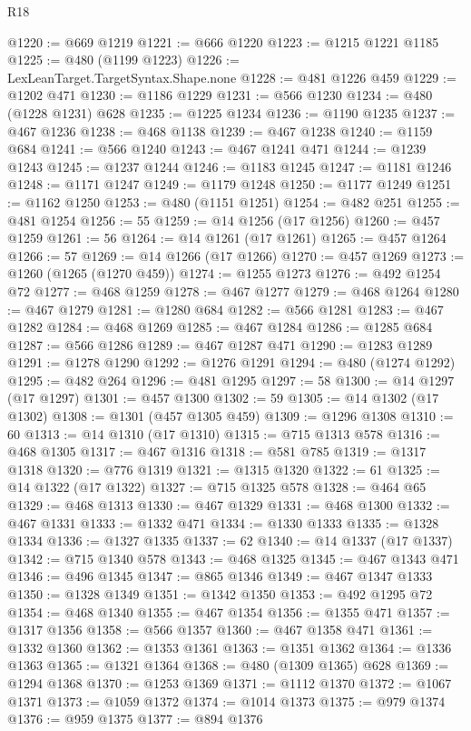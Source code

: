\begin{lexlean}{R18}
\begin{coremodule}
@1220 := @669 @1219
@1221 := @666 @1220
@1223 := @1215 @1221 @1185
@1225 := @480 (@1199 @1223)
@1226 := LexLeanTarget.TargetSyntax.Shape.none
@1228 := @481 @1226 @459
@1229 := @1202 @471
@1230 := @1186 @1229
@1231 := @566 @1230
@1234 := @480 (@1228 @1231) @628
@1235 := @1225 @1234
@1236 := @1190 @1235
@1237 := @467 @1236
@1238 := @468 @1138
@1239 := @467 @1238
@1240 := @1159 @684
@1241 := @566 @1240
@1243 := @467 @1241 @471
@1244 := @1239 @1243
@1245 := @1237 @1244
@1246 := @1183 @1245
@1247 := @1181 @1246
@1248 := @1171 @1247
@1249 := @1179 @1248
@1250 := @1177 @1249
@1251 := @1162 @1250
@1253 := @480 (@1151 @1251)
@1254 := @482 @251
@1255 := @481 @1254
@1256 := 55
@1259 := @14 @1256 (@17 @1256)
@1260 := @457 @1259
@1261 := 56
@1264 := @14 @1261 (@17 @1261)
@1265 := @457 @1264
@1266 := 57
@1269 := @14 @1266 (@17 @1266)
@1270 := @457 @1269
@1273 := @1260 (@1265 (@1270 @459))
@1274 := @1255 @1273
@1276 := @492 @1254 @72
@1277 := @468 @1259
@1278 := @467 @1277
@1279 := @468 @1264
@1280 := @467 @1279
@1281 := @1280 @684
@1282 := @566 @1281
@1283 := @467 @1282
@1284 := @468 @1269
@1285 := @467 @1284
@1286 := @1285 @684
@1287 := @566 @1286
@1289 := @467 @1287 @471
@1290 := @1283 @1289
@1291 := @1278 @1290
@1292 := @1276 @1291
@1294 := @480 (@1274 @1292)
@1295 := @482 @264
@1296 := @481 @1295
@1297 := 58
@1300 := @14 @1297 (@17 @1297)
@1301 := @457 @1300
@1302 := 59
@1305 := @14 @1302 (@17 @1302)
@1308 := @1301 (@457 @1305 @459)
@1309 := @1296 @1308
@1310 := 60
@1313 := @14 @1310 (@17 @1310)
@1315 := @715 @1313 @578
@1316 := @468 @1305
@1317 := @467 @1316
@1318 := @581 @785
@1319 := @1317 @1318
@1320 := @776 @1319
@1321 := @1315 @1320
@1322 := 61
@1325 := @14 @1322 (@17 @1322)
@1327 := @715 @1325 @578
@1328 := @464 @65
@1329 := @468 @1313
@1330 := @467 @1329
@1331 := @468 @1300
@1332 := @467 @1331
@1333 := @1332 @471
@1334 := @1330 @1333
@1335 := @1328 @1334
@1336 := @1327 @1335
@1337 := 62
@1340 := @14 @1337 (@17 @1337)
@1342 := @715 @1340 @578
@1343 := @468 @1325
@1345 := @467 @1343 @471
@1346 := @496 @1345
@1347 := @865 @1346
@1349 := @467 @1347 @1333
@1350 := @1328 @1349
@1351 := @1342 @1350
@1353 := @492 @1295 @72
@1354 := @468 @1340
@1355 := @467 @1354
@1356 := @1355 @471
@1357 := @1317 @1356
@1358 := @566 @1357
@1360 := @467 @1358 @471
@1361 := @1332 @1360
@1362 := @1353 @1361
@1363 := @1351 @1362
@1364 := @1336 @1363
@1365 := @1321 @1364
@1368 := @480 (@1309 @1365) @628
@1369 := @1294 @1368
@1370 := @1253 @1369
@1371 := @1112 @1370
@1372 := @1067 @1371
@1373 := @1059 @1372
@1374 := @1014 @1373
@1375 := @979 @1374
@1376 := @959 @1375
@1377 := @894 @1376

\end{coremodule}
\end{lexlean}

